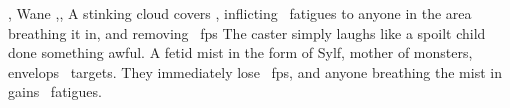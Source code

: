  {\mFate,\mAir}%
  {Wane}%
  {\duplicated,\detailed,\divergent}%
  {}%
  {A stinking cloud covers \spellArea, inflicting ~\glspl{fatigue} to anyone in the area breathing it in, and removing \rollConv~\glspl{fp}}%
  {
    The caster simply laughs like a spoilt child done something awful.
    A fetid mist in the form of Sylf, mother of monsters, envelops \spellArea\ targets.
    They immediately lose \rollConv~\glspl{fp}, and anyone breathing the mist in gains ~\glspl{fatigue}.
  }

